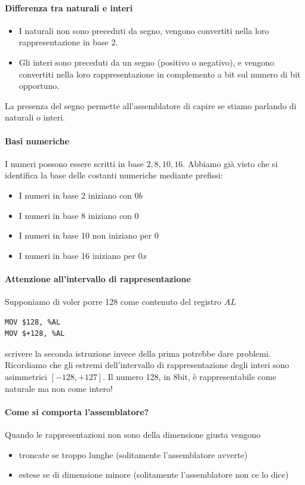 \documentclass[11pt]{report}
\begin{document}
\paragraph{Differenza tra naturali e interi}
\begin{itemize}
\item I naturali non sono preceduti da segno, vengono convertiti nella loro rappresentazione in base 2.
\item Gli interi sono preceduti da un segno (positivo o negativo), e vengono convertiti nella loro rappresentazione in complemento a bit sul numero di bit opportuno. 
\end{itemize}
La presenza del segno permette all'assemblatore di capire se stiamo parlando di naturali o interi.
\paragraph{Basi numeriche} I numeri possono essere scritti in base $2,8, 10, 16$. Abbiamo già visto che si identifica la base delle costanti numeriche mediante prefissi:
\begin{itemize}
\item I numeri in base 2 iniziano con $0b$
\item I numeri in base 8 iniziano con $0$
\item I numeri in base 10 non iniziano per $0$
\item I numeri in base 16 iniziano per $0x$
\end{itemize}
\paragraph{Attenzione all'intervallo di rappresentazione} Supponiamo di voler porre 128 come contenuto del registro $AL$
\begin{verbatim}
MOV $128, %AL
MOV $+128, %AL
\end{verbatim}
scrivere la seconda istruzione invece della prima potrebbe dare problemi. Ricordiamo che gli estremi dell'intervallo di rappresentazione degli interi sono asimmetrici $[-128,+127]$. Il numero 128, in 8bit, è rappresentabile come naturale ma non come intero!
\paragraph{Come si comporta l'assemblatore?} Quando le rappresentazioni non sono della dimensione giusta vengono
\begin{itemize}
\item troncate se troppo lunghe (solitamente l'assemblatore avverte)
\item estese se di dimensione minore (solitamente l'assemblatore non ce lo dice)
\end{itemize}
\end{document}
